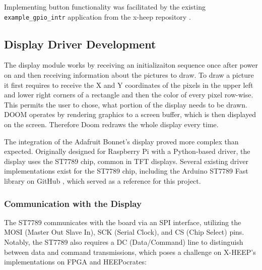 Implementing button functionality was facilitated by the existing \texttt{example\_gpio\_intr} application from the x-heep repository \cite{xHeepRepo}. \\


\subsection{Display Driver Development}

The display module works by receiving an initializaiton sequence once after power on and then receiving information about the pictures to draw. To draw a picture it first requires to receive the X and Y coordinates of the pixels in the upper left and lower right corners of a rectangle and then the color of every pixel row-wise. This permits the user to chose, what portion of the display needs to be drawn. DOOM operates by rendering graphics to a screen buffer, which is then displayed on the screen. Therefore Doom redraws the whole display every time.

The integration of the Adafruit Bonnet's display proved more complex than expected. Originally designed for Raspberry Pi with a Python-based driver, the display uses the ST7789 chip, common in TFT displays. Several existing driver implementations exist for the ST7789 chip, including the Arduino ST7789 Fast library on GitHub \cite{arduinoST7789}, which served as a reference for this project.

\subsubsection*{Communication with the Display}

The ST7789 communicates with the board via an SPI interface, utilizing the MOSI (Master Out Slave In), SCK (Serial Clock), and CS (Chip Select) pins. Notably, the ST7789 also requires a DC (Data/Command) line to distinguish between data and command transmissions, which poses a challenge on X-HEEP's implementations on FPGA and HEEPocrates: \\

